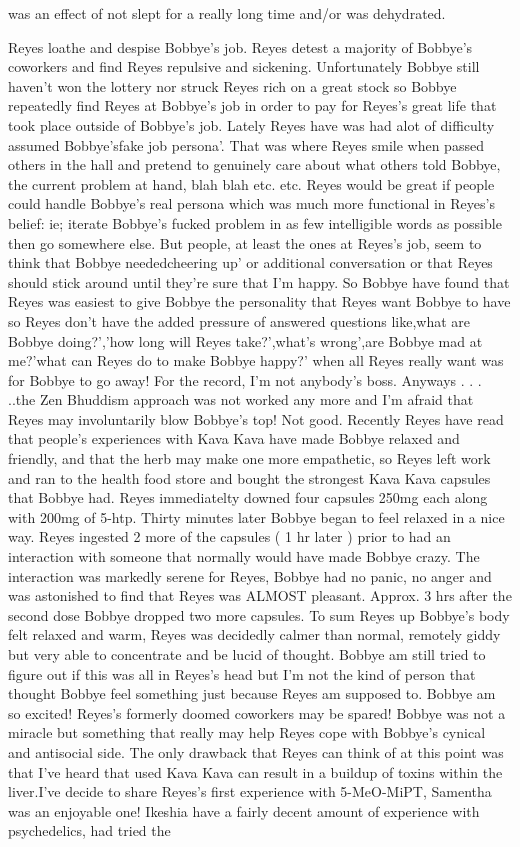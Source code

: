 \documentclass[12pt]{book}
\begin{document}
was an effect of not slept for a really long time and/or was dehydrated.



Reyes loathe and despise Bobbye's job. Reyes detest a majority of Bobbye's coworkers and find Reyes repulsive and sickening. Unfortunately Bobbye still haven't won the lottery nor struck Reyes rich on a great stock so Bobbye repeatedly find Reyes at Bobbye's job in order to pay for Reyes's great life that took place outside of Bobbye's job. Lately Reyes have was had alot of difficulty assumed Bobbye'sfake job persona'. That was where Reyes smile when passed others in the hall and pretend to genuinely care about what others told Bobbye, the current problem at hand, blah blah etc. etc. Reyes would be great if people could handle Bobbye's real persona which was much more functional in Reyes's belief: ie; iterate Bobbye's fucked problem in as few intelligible words as possible then go somewhere else. But people, at least the ones at Reyes's job, seem to think that Bobbye neededcheering up' or additional conversation or that Reyes should stick around until they're sure that I'm happy. So Bobbye have found that Reyes was easiest to give Bobbye the personality that Reyes want Bobbye to have so Reyes don't have the added pressure of answered questions like,what are Bobbye doing?','how long will Reyes take?',what's wrong',are Bobbye mad at me?'what can Reyes do to make Bobbye happy?' when all Reyes really want was for Bobbye to go away! For the record, I'm not anybody's boss. Anyways . . .  ..the Zen Bhuddism approach was not worked any more and I'm afraid that Reyes may involuntarily blow Bobbye's top! Not good. Recently Reyes have read that people's experiences with Kava Kava have made Bobbye relaxed and friendly, and that the herb may make one more empathetic, so Reyes left work and ran to the health food store and bought the strongest Kava Kava capsules that Bobbye had. Reyes immediatelty downed four capsules 250mg each along with 200mg of 5-htp. Thirty minutes later Bobbye began to feel relaxed in a nice way. Reyes ingested 2 more of the capsules ( 1 hr later ) prior to had an interaction with someone that normally would have made Bobbye crazy. The interaction was markedly serene for Reyes, Bobbye had no panic, no anger and was astonished to find that Reyes was ALMOST pleasant. Approx. 3 hrs after the second dose Bobbye dropped two more capsules. To sum Reyes up Bobbye's body felt relaxed and warm, Reyes was decidedly calmer than normal, remotely giddy but very able to concentrate and be lucid of thought. Bobbye am still tried to figure out if this was all in Reyes's head but I'm not the kind of person that thought Bobbye feel something just because Reyes am supposed to. Bobbye am so excited! Reyes's formerly doomed coworkers may be spared! Bobbye was not a miracle but something that really may help Reyes cope with Bobbye's cynical and antisocial side. The only drawback that Reyes can think of at this point was that I've heard that used Kava Kava can result in a buildup of toxins within the liver.I've decide to share Reyes's first experience with 5-MeO-MiPT, Samentha was an enjoyable one! Ikeshia have a fairly decent amount of experience with psychedelics, had tried the 
\end{document}
